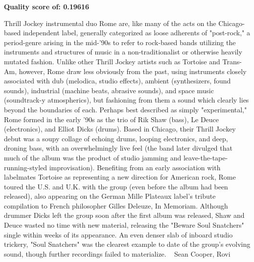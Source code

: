 \documentclass[conference]{IEEEtran}
\begin{document}
\textbf{Quality score of: 0.19616}
\begin{textbox}
Thrill Jockey instrumental duo Rome are, like many of the acts on the Chicago-based independent label, generally categorized as loose adherents of "post-rock," a period-genre arising in the mid-'90s to refer to rock-based bands utilizing the instruments and structures of music in a non-traditionalist or otherwise heavily mutated fashion. Unlike other Thrill Jockey artists such as Tortoise and Trans-Am, however, Rome draw less obviously from the past, using instruments closely associated with dub (melodica, studio effects), ambient (synthesizers, found sounds), industrial (machine beats, abrasive sounds), and space music (soundtrack-y atmospherics), but fashioning from them a sound which clearly lies beyond the boundaries of each. Perhaps best described as simply "experimental," Rome formed in the early '90s as the trio of Rik Shaw (bass), Le Deuce (electronics), and Elliot Dicks (drums). Based in Chicago, their Thrill Jockey debut was a soupy collage of echoing drums, looping electronics, and deep, droning bass, with an overwhelmingly live feel (the band later divulged that much of the album was the product of studio jamming and leave-the-tape-running-styled improvisation). Benefiting from an early association with labelmates Tortoise as representing a new direction for American rock, Rome toured the U.S. and U.K. with the group (even before the album had been released), also appearing on the German Mille Plateaux label's tribute compilation to French philosopher Gilles Deleuze, In Memoriam. Although drummer Dicks left the group soon after the first album was released, Shaw and Deuce wasted no time with new material, releasing the "Beware Soul Snatchers" single within weeks of its appearance. An even denser slab of inboard studio trickery, "Soul Snatchers" was the clearest example to date of the group's evolving sound, though further recordings failed to materialize. ~ Sean Cooper, Rovi
\end{textbox}
\end{document}
